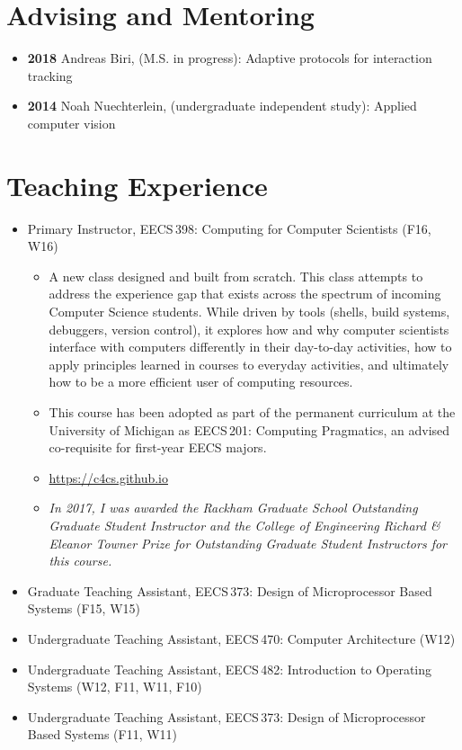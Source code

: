 \documentclass{article}
\begin{document}
\section*{Advising and Mentoring}

\begin{itemize}

  \item[] \textbf{2018} Andreas Biri, (M.S. in progress): Adaptive protocols for interaction tracking
  \item[] \textbf{2014} Noah Nuechterlein, (undergraduate independent study): Applied computer vision

\end{itemize}




\section*{Teaching Experience}

\begin{itemize}

  \item[] Primary Instructor, EECS\,398: Computing for Computer Scientists (F16, W16)
    \begin{itemize}
      \item[] A new class designed and built from scratch. This class attempts
        to address the experience gap that exists across the spectrum of
        incoming Computer Science students. While driven by tools (shells,
        build systems, debuggers, version control), it explores how and why
        computer scientists interface with computers differently in their
        day-to-day activities, how to apply principles learned in courses to
        everyday activities, and ultimately how to be a more efficient user of
        computing resources.
      \item[] This course has been adopted as part of the permanent curriculum
        at the University of Michigan as EECS\,201: Computing Pragmatics, an
        advised co-requisite for first-year EECS majors.
      \item[] \url{https://c4cs.github.io}
      \item[] \emph{In 2017, I was awarded the Rackham Graduate School Outstanding Graduate Student Instructor and the College of Engineering Richard \& Eleanor Towner Prize for Outstanding Graduate Student Instructors for this course.}
    \end{itemize}
  \item[] Graduate Teaching Assistant, EECS\,373: Design of Microprocessor Based Systems (F15, W15)
  \item[] Undergraduate Teaching Assistant, EECS\,470: Computer Architecture (W12)
  \item[] Undergraduate Teaching Assistant, EECS\,482: Introduction to Operating Systems (W12, F11, W11, F10)
  \item[] Undergraduate Teaching Assistant, EECS\,373: Design of Microprocessor Based Systems (F11, W11)

\end{itemize}
\end{document}
